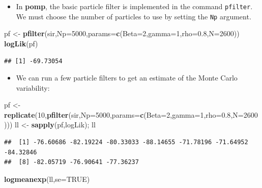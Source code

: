 \documentclass[]{article}
\newenvironment{Shaded}{\begin{snugshade}}{\end{snugshade}}
\newcommand{\KeywordTok}[1]{\textcolor[rgb]{0.13,0.29,0.53}{\textbf{#1}}}
\newcommand{\DataTypeTok}[1]{\textcolor[rgb]{0.13,0.29,0.53}{#1}}
\newcommand{\DecValTok}[1]{\textcolor[rgb]{0.00,0.00,0.81}{#1}}
\newcommand{\FloatTok}[1]{\textcolor[rgb]{0.00,0.00,0.81}{#1}}
\newcommand{\StringTok}[1]{\textcolor[rgb]{0.31,0.60,0.02}{#1}}
\newcommand{\OtherTok}[1]{\textcolor[rgb]{0.56,0.35,0.01}{#1}}
\newcommand{\NormalTok}[1]{#1}
\providecommand{\tightlist}{%
  \setlength{\itemsep}{0pt}\setlength{\parskip}{0pt}}
\begin{document}
\begin{itemize}
\tightlist
\item
  In \textbf{pomp}, the basic particle filter is implemented in the
  command \texttt{pfilter}. We must choose the number of particles to
  use by setting the \texttt{Np} argument.
\end{itemize}

\begin{Shaded}
\begin{Highlighting}[]
\NormalTok{pf <-}\StringTok{ }\KeywordTok{pfilter}\NormalTok{(sir,}\DataTypeTok{Np=}\DecValTok{5000}\NormalTok{,}\DataTypeTok{params=}\KeywordTok{c}\NormalTok{(}\DataTypeTok{Beta=}\DecValTok{2}\NormalTok{,}\DataTypeTok{gamma=}\DecValTok{1}\NormalTok{,}\DataTypeTok{rho=}\FloatTok{0.8}\NormalTok{,}\DataTypeTok{N=}\DecValTok{2600}\NormalTok{))}
\KeywordTok{logLik}\NormalTok{(pf)}
\end{Highlighting}
\end{Shaded}

\begin{verbatim}
## [1] -69.73054
\end{verbatim}

\begin{itemize}
\tightlist
\item
  We can run a few particle filters to get an estimate of the Monte
  Carlo variability:
\end{itemize}

\begin{Shaded}
\begin{Highlighting}[]
\NormalTok{pf <-}\StringTok{ }\KeywordTok{replicate}\NormalTok{(}\DecValTok{10}\NormalTok{,}\KeywordTok{pfilter}\NormalTok{(sir,}\DataTypeTok{Np=}\DecValTok{5000}\NormalTok{,}\DataTypeTok{params=}\KeywordTok{c}\NormalTok{(}\DataTypeTok{Beta=}\DecValTok{2}\NormalTok{,}\DataTypeTok{gamma=}\DecValTok{1}\NormalTok{,}\DataTypeTok{rho=}\FloatTok{0.8}\NormalTok{,}\DataTypeTok{N=}\DecValTok{2600}\NormalTok{)))}
\NormalTok{ll <-}\StringTok{ }\KeywordTok{sapply}\NormalTok{(pf,logLik); ll}
\end{Highlighting}
\end{Shaded}

\begin{verbatim}
##  [1] -76.60686 -82.19224 -80.33033 -88.14655 -71.78196 -71.64952 -84.32846
##  [8] -82.05719 -76.90641 -77.36237
\end{verbatim}

\begin{Shaded}
\begin{Highlighting}[]
\KeywordTok{logmeanexp}\NormalTok{(ll,}\DataTypeTok{se=}\OtherTok{TRUE}\NormalTok{)}
\end{Highlighting}
\end{Shaded}
\end{document}
